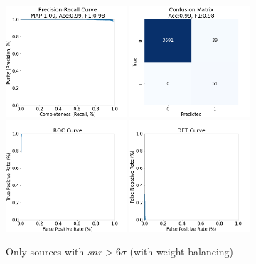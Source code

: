 \documentclass[DM,authoryear,toc]{lsstdoc}
\begin{document}
\begin{figure}[h]
  \centering
  \includegraphics[width=0.4\textwidth]{precrec_13-resnet50-FullAugmentation-scratch-B64__0255000__npy_data_0.1.2-6sigma_256by256__posw_20.png}
  \includegraphics[width=0.4\textwidth]{confmat_13-resnet50-FullAugmentation-scratch-B64__0255000__npy_data_0.1.2-6sigma_256by256__posw_20.png}
  \includegraphics[width=0.4\textwidth]{roc_13-resnet50-FullAugmentation-scratch-B64__0255000__npy_data_0.1.2-6sigma_256by256__posw_20.png}
  \includegraphics[width=0.4\textwidth]{det_13-resnet50-FullAugmentation-scratch-B64__0255000__npy_data_0.1.2-6sigma_256by256__posw_20.png}
  \caption{Only sources with $snr > 6\sigma$  (with weight-balancing)}
  \label{fig:tract_templates}
\end{figure}
\end{document}
